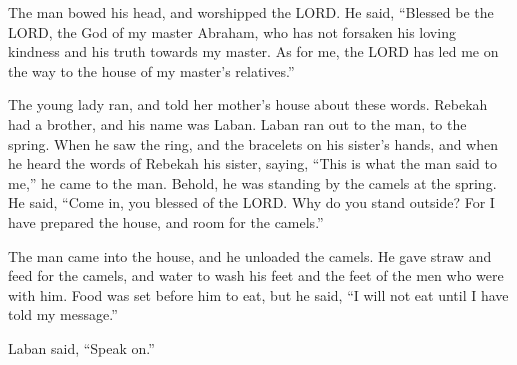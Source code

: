  The man bowed his head, and worshipped the LORD.
 He said, ``Blessed be the LORD, the God of my master
Abraham, who has not forsaken his loving kindness and his truth towards
my master. As for me, the LORD has led me on the way to the house of my
master's relatives.''

 The young lady ran, and told her mother's house about
these words.  Rebekah had a brother, and his name was
Laban. Laban ran out to the man, to the spring.  When he
saw the ring, and the bracelets on his sister's hands, and when he heard
the words of Rebekah his sister, saying, ``This is what the man said to
me,'' he came to the man. Behold, he was standing by the camels at the
spring.  He said, ``Come in, you blessed of the LORD. Why
do you stand outside? For I have prepared the house, and room for the
camels.''

 The man came into the house, and he unloaded the camels.
He gave straw and feed for the camels, and water to wash his feet and
the feet of the men who were with him.  Food was set
before him to eat, but he said, ``I will not eat until I have told my
message.''

Laban said, ``Speak on.''

